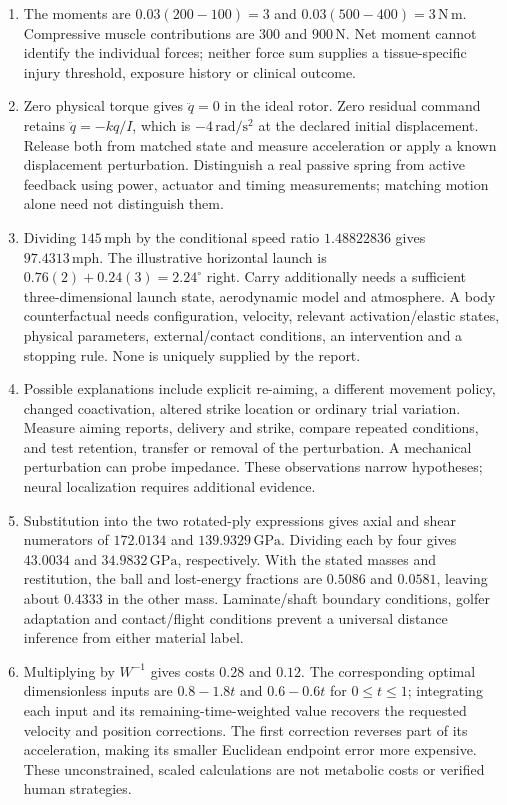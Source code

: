 \begin{enumerate}[leftmargin=*]
\item The moments are $0.03(200-100)=3$ and $0.03(500-400)=3\,\mathrm{N\,m}$. Compressive muscle contributions are $300$ and $900\,\mathrm{N}$. Net moment cannot identify the individual forces; neither force sum supplies a tissue-specific injury threshold, exposure history or clinical outcome.
\item Zero physical torque gives $\ddot q=0$ in the ideal rotor. Zero residual command retains $\ddot q=-kq/I$, which is $-4\,\mathrm{rad/s^2}$ at the declared initial displacement. Release both from matched state and measure acceleration or apply a known displacement perturbation. Distinguish a real passive spring from active feedback using power, actuator and timing measurements; matching motion alone need not distinguish them.
\item Dividing $145\,\mathrm{mph}$ by the conditional speed ratio $1.48822836$ gives $97.4313\,\mathrm{mph}$. The illustrative horizontal launch is $0.76(2)+0.24(3)=2.24^\circ$ right. Carry additionally needs a sufficient three-dimensional launch state, aerodynamic model and atmosphere. A body counterfactual needs configuration, velocity, relevant activation/elastic states, physical parameters, external/contact conditions, an intervention and a stopping rule. None is uniquely supplied by the report.
\item Possible explanations include explicit re-aiming, a different movement policy, changed coactivation, altered strike location or ordinary trial variation. Measure aiming reports, delivery and strike, compare repeated conditions, and test retention, transfer or removal of the perturbation. A mechanical perturbation can probe impedance. These observations narrow hypotheses; neural localization requires additional evidence.
\item Substitution into the two rotated-ply expressions gives axial and shear numerators of $172.0134$ and $139.9329\,\mathrm{GPa}$. Dividing each by four gives $43.0034$ and $34.9832\,\mathrm{GPa}$, respectively. With the stated masses and restitution, the ball and lost-energy fractions are $0.5086$ and $0.0581$, leaving about $0.4333$ in the other mass. Laminate/shaft boundary conditions, golfer adaptation and contact/flight conditions prevent a universal distance inference from either material label.
\item Multiplying by $W^{-1}$ gives costs $0.28$ and $0.12$. The corresponding optimal dimensionless inputs are $0.8-1.8t$ and $0.6-0.6t$ for $0\leq t\leq1$; integrating each input and its remaining-time-weighted value recovers the requested velocity and position corrections. The first correction reverses part of its acceleration, making its smaller Euclidean endpoint error more expensive. These unconstrained, scaled calculations are not metabolic costs or verified human strategies.

\end{enumerate}
